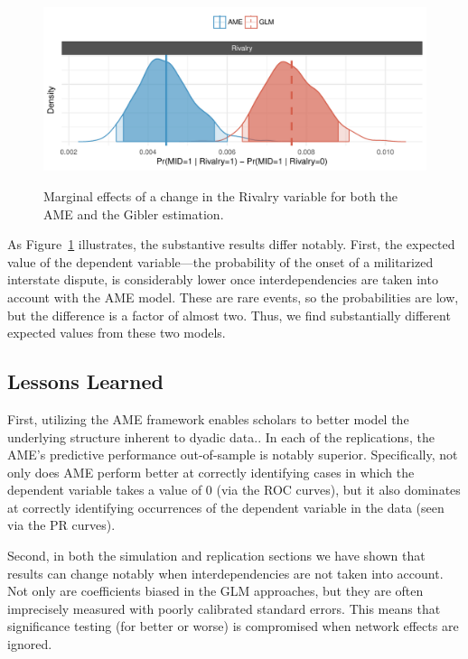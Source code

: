 \begin{figure}
	\caption{Marginal effects of a change in the Rivalry variable for both the AME and the Gibler estimation.  \label{fig:gibmargeff}}
	\includegraphics[width=\textwidth]{graphics/gibler_margeff.pdf}
 	\label{fig:gibmargeff}
 \end{figure}

As Figure~\ref{fig:gibmargeff} illustrates, the substantive results differ notably. First, the expected value of the dependent variable---the probability of the onset of a militarized interstate dispute, is considerably lower once interdependencies are taken into account with the AME model.  These are rare events, so the probabilities are low, but the difference is a factor of almost two. Thus, we find substantially different expected values from these two models.  

\subsection{Lessons Learned}

First, utilizing the AME framework enables scholars to better model the underlying structure inherent to dyadic data.. In each of the replications, the AME's predictive performance out-of-sample is notably superior. Specifically, not only does AME perform better at correctly identifying cases in which the dependent variable takes a value of $0$ (via the ROC curves), but it also dominates at correctly identifying occurrences of the dependent variable in the data (seen via the PR curves). 

Second, in both the simulation  and replication sections  we have shown that results can change notably when interdependencies are not taken into account. Not only are coefficients biased in the GLM approaches, but they are often imprecisely measured with poorly calibrated standard errors.  This means that significance testing (for better or worse) is compromised when network effects are ignored.

